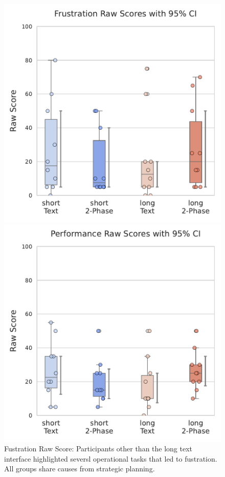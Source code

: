 \begin{figure}[h]
    \begin{minipage}[t]{0.45\textwidth}
        \centering
        \includegraphics[width=\textwidth, trim=0 13 0 13, clip]{content/image/cog/Frustration_scores.pdf}
        \captionsetup{width=0.9\textwidth, justification=justified} %
       \caption{Fustration Raw Score: Participants other than the long text interface highlighted seversl operational tasks that led to fustration. All groups share causes from strategic planning.}
        \label{fig:physical_cog_score}
    \end{minipage}
    \hfill
    \begin{minipage}[t]{0.45\textwidth}
        \centering
        \includegraphics[width=\textwidth, trim=0 13 0 13, clip]{content/image/cog/Performance_scores.pdf}

\end{minipage}
\end{figure}
